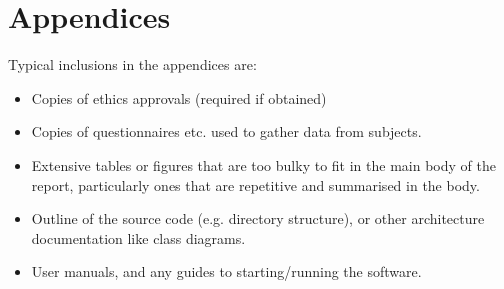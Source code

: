 \documentclass{l4proj}
\begin{document}



\chapter{Appendices}


Typical inclusions in the appendices are:

\begin{itemize}
\item
  Copies of ethics approvals (required if obtained)
\item
  Copies of questionnaires etc. used to gather data from subjects.
\item
  Extensive tables or figures that are too bulky to fit in the main body of
  the report, particularly ones that are repetitive and summarised in the body.

\item Outline of the source code (e.g. directory structure), or other architecture documentation like class diagrams.

\item User manuals, and any guides to starting/running the software.

\end{itemize}
\end{document}
